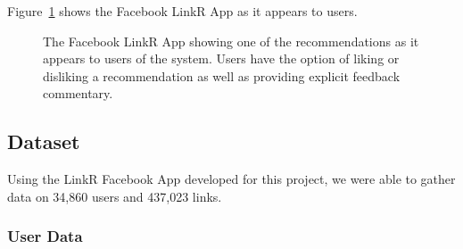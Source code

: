Figure~\ref{fig:linkr_app} shows the Facebook LinkR App as it appears
to users.
\begin{figure}[t!]
\hspace{-2mm} 
\caption{The Facebook LinkR App showing one of the recommendations
as it appears to users of the system.  Users have the option of liking
or disliking a recommendation as well as providing explicit feedback
commentary.}
\label{fig:linkr_app}
\end{figure}

\subsection{Dataset}

\label{sec:dataset}

Using the LinkR Facebook App developed for this project, we were able
to gather data on 34,860 users and 437,023 links.

\subsubsection{User Data}

